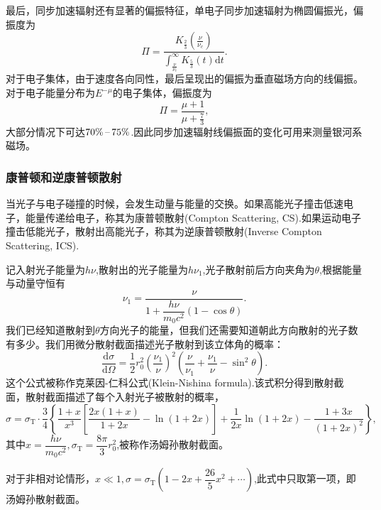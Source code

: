 \documentclass[../天体物理基础.tex]{subfiles}
\begin{document}
最后，同步加速辐射还有显著的偏振特征，单电子同步加速辐射为椭圆偏振光，偏振度为
\begin{equation}
\Pi=\frac{K_{\frac{2}{3}}\left(\frac{\nu}{\nu_{c}}\right)}{\int_{\frac{\nu}{\nu_{c}}}^{\infty}K_{\frac{5}{3}}\left(t\right)\mathrm{d}t}.
\end{equation}
对于电子集体，由于速度各向同性，最后呈现出的偏振为垂直磁场方向的线偏振。对于电子能量分布为$E^{-\mu}$的电子集体，偏振度为
\begin{equation}
\Pi=\frac{\mu+1}{\mu+\frac{7}{3}},
\end{equation}
大部分情况下可达$70\%\,\text{\textendash}\,75\%$.因此同步加速辐射线偏振面的变化可用来测量银河系磁场。

\subsubsection{康普顿和逆康普顿散射}
当光子与电子碰撞的时候，会发生动量与能量的交换。如果高能光子撞击低速电子，能量传递给电子，称其为康普顿散射(Compton Scattering, CS).如果运动电子撞击低能光子，散射出高能光子，称其为逆康普顿散射(Inverse Compton Scattering, ICS).

记入射光子能量为$h\nu$,散射出的光子能量为$h\nu_{1}$,光子散射前后方向夹角为$\theta$,根据能量与动量守恒有
\begin{equation}
\nu_{1}=\frac{\nu}{1+\dfrac{h\nu}{m_{0}c^{2}}\left(1-\cos\theta\right)}.
\end{equation}
我们已经知道散射到$\theta$方向光子的能量，但我们还需要知道朝此方向散射的光子数有多少。我们用微分散射截面描述光子散射到该立体角的概率：
\begin{equation}
\frac{\mathrm{d}\sigma}{\mathrm{d}\Omega}=\frac{1}{2}r_{0}^{2}\left(\frac{\nu_{1}}{\nu}\right)^{2}\left(\frac{\nu}{\nu_{1}}+\frac{\nu_{1}}{\nu}-\sin^{2}\theta\right).
\end{equation}
这个公式被称作克莱因-仁科公式(Klein-Nishina formula).该式积分得到散射截面，散射截面描述了每个入射光子被散射的概率，
\begin{equation}
\sigma=\sigma_{\text{T}}\cdot\frac34\left\{\frac{1+x}{x^{3}}\left[\frac{2x\left(1+x\right)}{1+2x}-\ln\left(1+2x\right)\right]+\frac1{2x}\ln\left(1+2x\right)-\frac{1+3x}{\left(1+2x\right)^{2}}\right\},
\end{equation}
其中$x=\dfrac{h\nu}{m_{0}c^{2}},\sigma_{\text{T}}=\dfrac{8\pi}{3}r_{0}^{2}$,被称作汤姆孙散射截面。

对于非相对论情形，$x\ll1,\sigma=\sigma_{\text{T}}\left(1-2x+\dfrac{26}{5}x^{2}+\cdots\right)$,此式中只取第一项，即汤姆孙散射截面。
\end{document}
